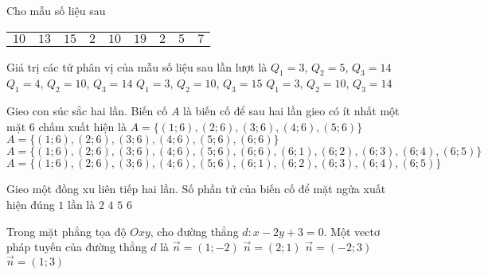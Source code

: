 \begin{ex}%
	Cho mẫu số liệu sau
	\begin{center}
		\begin{tabular}{ccccccccc}
			$10$ & $13$ & $15$ & $2$ & $10$ & $19$ & $2$ & $5$ & $7$
		\end{tabular}
	\end{center}
	Giá trị các tứ phân vị của mẫu số liệu sau lần lượt là
	\choice
	{$Q_1=3$, $Q_2=5$, $Q_3=14$}
	{$Q_1=4$, $Q_2=10$, $Q_3=14$}
	{$Q_1=3$, $Q_2=10$, $Q_3=15$}
	{\True $Q_1=3$, $Q_2=10$, $Q_3=14$}
\end{ex}

\begin{ex}%
	Gieo con súc sắc hai lần. Biến cố $A$ là biến cố để sau hai lần gieo có ít nhất một mặt $6$ chấm xuất hiện là
	\choice
	{$A=\{(1;6),(2;6),(3;6),(4;6),(5;6)\}$}
	{$A=\{(1;6),(2;6),(3;6),(4;6),(5;6),(6;6)\}$}
	{\True $A=\{(1;6),(2;6),(3;6),(4;6),(5;6),(6;6),(6;1),(6;2),(6;3),(6;4),(6;5)\}$}
	{$A=\{(1;6),(2;6),(3;6),(4;6),(5;6),(6;1),(6;2),(6;3),(6;4),(6;5)\}$}
\end{ex}

\begin{ex}%
	Gieo một đồng xu liên tiếp hai lần. Số phần tử của biến cố để mặt ngửa xuất hiện đúng $1$ lần là
	\choice
	{\True $2$}
	{$4$}
	{$5$}
	{$6$}
\end{ex}

\begin{ex}%
	Trong mặt phẳng tọa độ $Oxy$, cho đường thẳng $d\colon x-2y+3=0$. Một vectơ pháp tuyến của đường thẳng $d$ là
	\choice
	{\True $\overrightarrow{n}=(1;-2)$}
	{$\overrightarrow{n}=(2;1)$}
	{$\overrightarrow{n}=(-2;3)$}
	{$\overrightarrow{n}=(1;3)$}
\end{ex}

